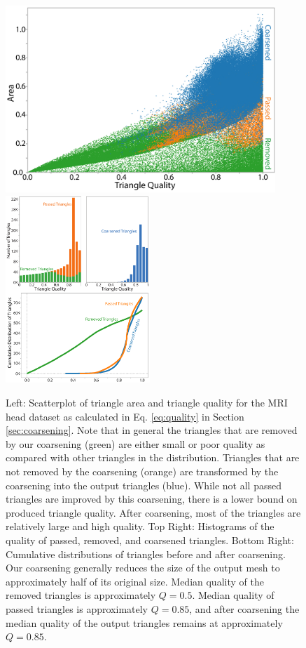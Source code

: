 \documentclass[review,journal]{vgtc}         %
\begin{document}
\begin{figure}[!tb]
\begin{center}
\includegraphics[height=7.05cm]{ScatterAll.png}
\hspace{0.1cm}
\includegraphics[height=7.05cm]{MergedFigures.pdf}
\caption{Left: Scatterplot of triangle area and triangle quality for the MRI head dataset as calculated in Eq. \ref{eq:quality} in Section \ref{sec:coarsening}. Note that in general the triangles that are removed by our coarsening (green) are either small or poor quality as compared with other triangles in the distribution. Triangles that are not removed by the coarsening (orange) are transformed by the coarsening into the output triangles (blue). While not all passed triangles are improved by this coarsening, there is a lower bound on produced triangle quality. After coarsening, most of the triangles are relatively large and high quality.
Top Right: Histograms of the quality of passed, removed, and coarsened triangles.
Bottom Right: Cumulative distributions of triangles before and after coarsening. Our coarsening generally reduces the size of the output mesh to approximately half of its original size. Median quality of the removed triangles is approximately $Q=0.5$. Median quality of passed triangles is approximately $Q=0.85$, and after coarsening the median quality of the output triangles remains at approximately $Q=0.85$.}
\label{fig:coarseninggraphs}
\end{center}
\end{figure}
\end{document}
